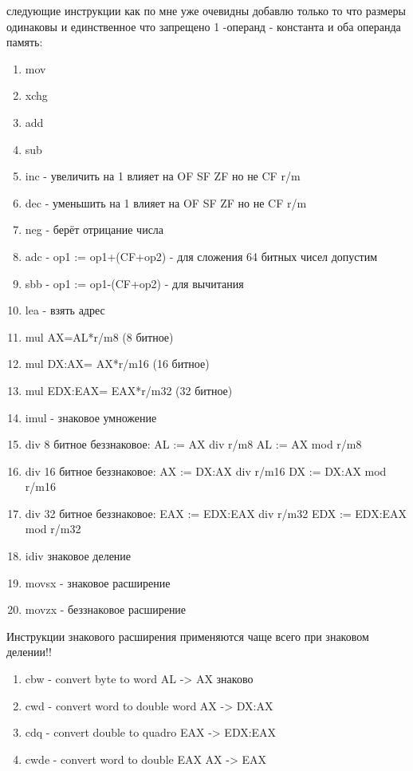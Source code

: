 \documentclass[a4paper,10pt]{article}
\begin{document}
следующие инструкции как по мне уже очевидны добавлю только то что размеры одинаковы и единственное что запрещено 1 -операнд - константа и оба операнда память:
\begin{enumerate}
    \item[] mov
    \item[] xchg
    \item[] add
    \item[] sub
    \item[] inc - увеличить на 1 влияет на OF SF ZF но не CF r/m
    \item[] dec - уменьшить на 1 влияет на OF SF ZF но не CF r/m
    \item[] neg - берёт отрицание числа
    \item[] adc - op1 := op1+(CF+op2) - для сложения 64 битных чисел допустим
    \item[] sbb - op1 := op1-(CF+op2) - для вычитания
    \item[] lea - взять адрес
    \item[] mul AX=AL*r/m8 (8 битное)
    \item[] mul DX:AX= AX*r/m16 (16 битное)
    \item[] mul EDX:EAX= EAX*r/m32 (32 битное)
    \item[] imul - знаковое умножение
    \item[] div 8 битное беззнаковое: AL := AX div r/m8 AL := AX mod r/m8 
    \item[] div 16 битное беззнаковое: AX := DX:AX div r/m16 DX := DX:AX mod r/m16 
    \item[] div 32 битное беззнаковое: EAX := EDX:EAX div r/m32 EDX := EDX:EAX mod r/m32 
    \item[] idiv знаковое деление
    \item[] movsx - знаковое расширение
    \item[] movzx - беззнаковое расширение
\end{enumerate}
Инструкции знакового расширения применяются чаще всего при знаковом делении!!
\begin{enumerate}
    \item cbw - convert byte to word AL -> AX знаково
    \item cwd - convert word to double word AX -> DX:AX
    \item cdq - convert double to quadro EAX -> EDX:EAX
    \item cwde - convert word to double EAX AX -> EAX
\end{enumerate}
\vspace{0.5cm} 
\end{document}
